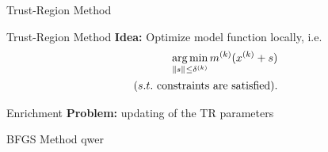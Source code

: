 \begin{frame}{Trust-Region Method}
    \begin{block}{Trust-Region Method}
        \textbf{Idea:} Optimize model function locally, i.e.\@
        \begin{align*}
            \operatorname*{arg\,min}\limits_{\left\lVert s\right\rVert_{} \leq \delta^{(k)}} m^{(k)}(x^{(k)} + s) \\
            (s.t. \text{ constraints are satisfied}).
        \end{align*}
    \end{block}
\end{frame}

\begin{frame}{Enrichment}
    \textbf{Problem:} updating of the TR parameters
\end{frame}

\begin{frame}{BFGS Method}
    qwer
\end{frame}